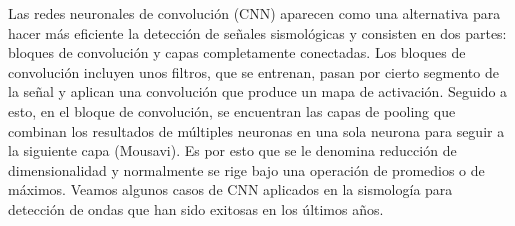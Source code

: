 \documentclass[../main.tex]{subfiles}
\begin{document}
Las redes neuronales de convolución (CNN) aparecen como una alternativa para hacer más eficiente la detección de señales sismológicas y consisten en dos partes: bloques de convolución y capas completamente conectadas. Los bloques de convolución incluyen unos filtros, que se entrenan, pasan por cierto segmento de la señal y aplican una convolución que produce un mapa de activación. Seguido a esto, en el bloque de convolución, se encuentran las capas de pooling que combinan los resultados de múltiples neuronas en una sola neurona para seguir a la siguiente capa (Mousavi). Es por esto que se le denomina reducción de dimensionalidad y normalmente se rige bajo una operación de promedios o de máximos. Veamos algunos casos de CNN aplicados en la sismología para detección de ondas que han sido exitosas en los últimos años.
\end{document}
